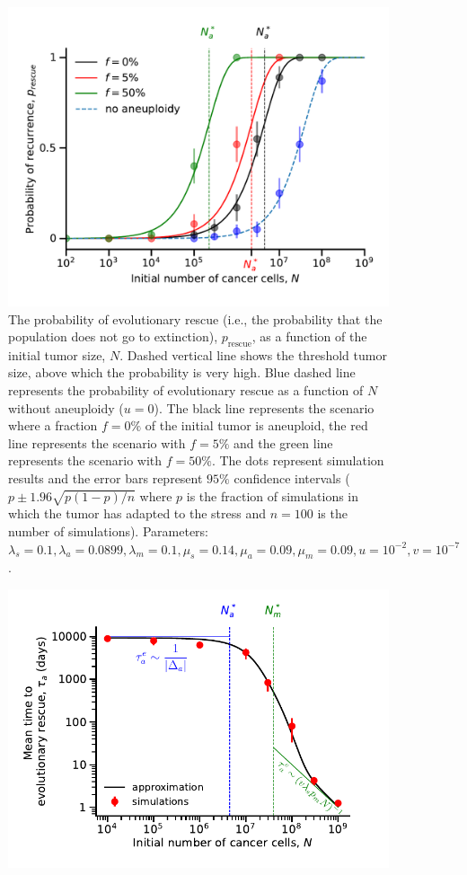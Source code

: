 \documentclass[12pt]{extarticle}
\newcommand{\presc}{p_\text{rescue}}
\begin{document}
\begin{appendices}
\begin{figure}
\includegraphics[width=1\textwidth]{Figures/ProbvN_SGV_Plot.pdf}
\caption{The probability of evolutionary rescue (i.e., the probability that the population does not go to extinction), $\presc$, as a function of the initial tumor size, $N$. Dashed vertical line shows the threshold tumor size, above which the probability is very high. Blue dashed line represents the probability of evolutionary rescue as a function of $N$ without aneuploidy ($u=0$). The black line represents the scenario where a fraction $f=0\%$ of the initial tumor is aneuploid, the red line represents the scenario with $f=5\%$ and the green line represents the scenario with $f=50\%$. The dots represent simulation results and the error bars represent $95\%$ confidence intervals ($p\pm1.96\sqrt{p\left(1-p\right)/n}$ where $p$ is the fraction of simulations in which the tumor has adapted to the stress and $n=100$ is the number of simulations). Parameters: $\lambda_s=0.1,\lambda_a=0.0899,\lambda_m=0.1,\mu_s=0.14,\mu_a=0.09,\mu_m=0.09, u=10^{-2}, v=10^{-7}$.} %
\label{rescue_prob_sgv}
\end{figure}
\begin{figure}
\vspace*{1\baselineskip}
\includegraphics[width=1\textwidth]{Figures/EvolutionaryRescueTimeComplete.pdf} %

\end{figure}
\end{appendices}
\end{document}
